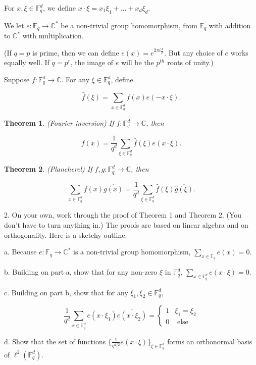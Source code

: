 \documentclass{amsart}
\newtheorem{theorem}{Theorem}
\newcommand{\FF}{\mathbb{F}}
\newcommand{\CC}{\mathbb{C}}
\begin{document}
For $x, \xi \in \FF_q^d$,  we define $x \cdot \xi = x_1 \xi_1 + ... + x_d \xi_d$.

We let $e: \FF_q \rightarrow \CC^*$ be a non-trivial group homomorphism,  from $\FF_q$ with addition to $\CC^*$ with multiplication.  

(If $q =p$ is prime,  then we can define $e(x) = e^{2 \pi i \frac{x}{p}}$.   But any choice of $e$ works equally well.  If $q = p^r$,  the image of $e$ will be the $p^{th}$ roots of unity.)

Suppose $f: \FF_q^d \rightarrow \CC$.   For any $\xi \in \FF_q^d$,  define

$$ \hat f(\xi) = \sum_{x \in \FF_q^d} f(x) e( - x \cdot \xi). $$

\begin{theorem} (Fourier inversion) If $f: \FF_q^d \rightarrow \CC$,  then

$$ f(x) = \frac{1}{q^d} \sum_{\xi \in \FF_q^d}  \hat f(\xi) e(x \cdot \xi). $$

\end{theorem}


\begin{theorem} (Plancherel) If $f,  g: \FF_q^d \rightarrow \CC$,  then

$$\sum_{x \in \FF_q^d} f(x) \overline{g(x)} = \frac{1}{q^d} \sum_{\xi \in \FF_q^d}  \hat f(\xi) \overline{\hat g(\xi)}. $$

\end{theorem}

\vskip10pt

2.  On your own,  work through the proof of Theorem 1 and Theorem 2.   (You don't have to turn anything in.)  The proofs are based on linear algebra and on orthogonality.   Here is a sketchy outline.

a.  Because $e: \FF_q \rightarrow \CC^*$ is a non-trivial group homomorphism,  $\sum_{x \in \FF_q} e(x) = 0$.

b.  Building on part a,  show that for any non-zero $\xi$ in $\FF_q^d$,  $\sum_{x \in \FF_q^d} e(x \cdot \xi) = 0$.

c.  Building on part b,  show that for any $\xi_1,  \xi_2 \in \FF_q^d$,

$$ \frac{1}{q^d} \sum_{x \in \FF_q^d} e(x \cdot \xi_1) \overline{ e(x \cdot \xi_2)} = \begin{cases} 1 & \xi_1 = \xi_2 \\ 0 & \textrm{ else }
\end{cases} $$

d.  Show that the set of functions $\{ \frac{1}{q^{d/2}} e(x \cdot \xi) \}_{\xi \in \FF_q^d}$ forms an orthonormal basis of $\ell^2(\FF_q^d)$.
\end{document}
